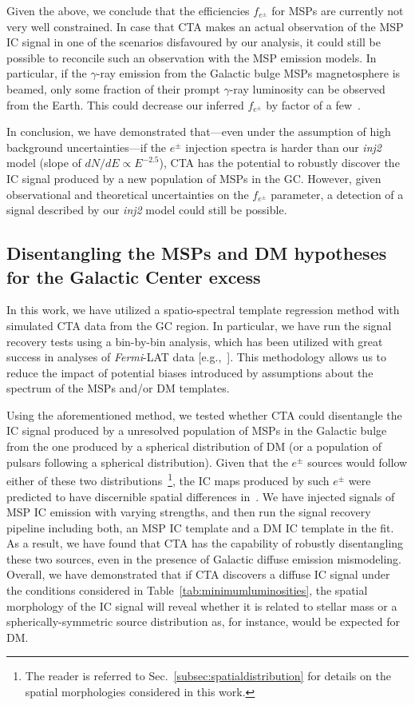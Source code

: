 \documentclass[doublespace,nopageskip]{VTthesis} %
\begin{document}
 

Given the above, 
we conclude that the efficiencies $f_{e^{\pm}}$ for MSPs are currently not very well constrained. In case that CTA makes an actual observation of the MSP IC signal in one of the scenarios disfavoured by our analysis, it could still be possible to reconcile such an observation with the MSP emission models. In particular, if the $\gamma$-ray emission from the Galactic bulge MSPs magnetosphere is beamed, only some fraction of their prompt $\gamma$-ray luminosity can be observed from the Earth. This could decrease our inferred $f_{e^{\pm}}$ by factor of a few~\citep{Sudoh:2020hyu}.  

In conclusion, we have demonstrated that---even under the assumption of high background uncertainties---if the $e^\pm$ injection spectra is harder than our \textit{inj2} model (slope of $dN/dE \propto E^{-2.5}$),  CTA has the potential to robustly discover the IC signal produced by a new population of MSPs in the GC. However, given observational and theoretical uncertainties on the $f_{e^{\pm}}$ parameter, a detection of a signal described by our \textit{inj2} model could still be possible. 


\subsection{Disentangling the MSPs and DM hypotheses for the Galactic Center excess}
\label{subsec:disentanglingMSPsfromDM}

In this work, we have utilized a spatio-spectral template regression method with simulated CTA data from the GC region. In particular, we have run the signal recovery tests using a bin-by-bin analysis, which has been utilized with great success in analyses of \textit{Fermi}-LAT data [e.g.,~\citep{Ackermann:2015zua,TheFermi-LAT:2017vmf}]. This methodology allows us to reduce the impact of potential biases introduced by assumptions about the spectrum of the MSPs and/or DM templates.
 

Using the aforementioned method, we tested whether CTA could disentangle the IC signal produced by a unresolved population of MSPs in the Galactic bulge from the one produced by a spherical distribution of DM (or a population of pulsars following a spherical distribution). Given that the $e^\pm$ sources would follow either of these two distributions~\footnote{The reader is referred to Sec.~\ref{subsec:spatialdistribution} for details on the spatial morphologies considered in this work.}, the IC maps produced by such $e^\pm$ were predicted to have discernible spatial differences in~\cite{Song:2019nrx}. We have injected signals of MSP IC emission with varying strengths, and then run the signal recovery pipeline including both, an MSP IC template and a DM IC template in the fit. As a result, we have found that CTA has the capability of robustly disentangling these two sources, even in the presence of Galactic diffuse emission mismodeling. Overall, we have demonstrated that if CTA discovers a diffuse IC signal under the conditions considered in Table~\ref{tab:minimumluminosities}, the spatial morphology of the IC signal will reveal whether it is related to stellar mass or a spherically-symmetric source distribution as, for instance, would be expected for DM.
\end{document}
